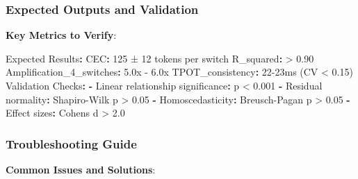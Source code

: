 \documentclass[
  11pt]{article}
\newenvironment{Shaded}{}{}
\newcommand{\AttributeTok}[1]{\textcolor[rgb]{0.49,0.56,0.16}{#1}}
\newcommand{\FunctionTok}[1]{\textcolor[rgb]{0.02,0.16,0.49}{#1}}
\newcommand{\KeywordTok}[1]{\textcolor[rgb]{0.00,0.44,0.13}{\textbf{#1}}}
\begin{document}
\subsubsection{Expected Outputs and
Validation}\label{expected-outputs-and-validation}

\textbf{Key Metrics to Verify}:

\begin{Shaded}
\begin{Highlighting}[]
\FunctionTok{Expected Results}\KeywordTok{:}
\AttributeTok{  }\FunctionTok{CEC}\KeywordTok{:}\AttributeTok{ 125 ± 12 tokens per switch}
\AttributeTok{  }\FunctionTok{R\_squared}\KeywordTok{:}\AttributeTok{ \textgreater{} 0.90}
\AttributeTok{  }\FunctionTok{Amplification\_4\_switches}\KeywordTok{:}\AttributeTok{ 5.0x {-} 6.0x}
\AttributeTok{  }\FunctionTok{TPOT\_consistency}\KeywordTok{:}\AttributeTok{ 22{-}23ms (CV \textless{} 0.15)}
\AttributeTok{  }
\FunctionTok{Validation Checks}\KeywordTok{:}
\AttributeTok{  }\KeywordTok{{-}}\AttributeTok{ }\FunctionTok{Linear relationship significance}\KeywordTok{:}\AttributeTok{ p \textless{} 0.001}
\AttributeTok{  }\KeywordTok{{-}}\AttributeTok{ }\FunctionTok{Residual normality}\KeywordTok{:}\AttributeTok{ Shapiro{-}Wilk p \textgreater{} 0.05}
\AttributeTok{  }\KeywordTok{{-}}\AttributeTok{ }\FunctionTok{Homoscedasticity}\KeywordTok{:}\AttributeTok{ Breusch{-}Pagan p \textgreater{} 0.05}
\AttributeTok{  }\KeywordTok{{-}}\AttributeTok{ }\FunctionTok{Effect sizes}\KeywordTok{:}\AttributeTok{ Cohen\textquotesingle{}s d \textgreater{} 2.0}
\end{Highlighting}
\end{Shaded}

\subsubsection{Troubleshooting Guide}\label{troubleshooting-guide}

\textbf{Common Issues and Solutions}:
\end{document}
